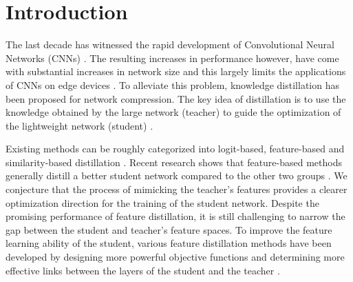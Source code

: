 \documentclass{article}
\begin{document}
\section{Introduction}
The last decade has witnessed the rapid development of Convolutional Neural Networks (CNNs) \cite{alexnet,inception,resnet,convnext,zhi1}. %
The resulting increases in performance however, have come with substantial increases in network size and this largely limits the applications of CNNs on edge devices \cite{mobilenets}. To alleviate this problem, knowledge distillation has been proposed for network compression. The key idea of distillation is to use the knowledge obtained by the large network (teacher) to guide the optimization of the lightweight network (student) \cite{kd,fitnets,sp}.

Existing methods can be roughly categorized into logit-based, feature-based and similarity-based distillation \cite{kdsurvey}. Recent research shows that feature-based methods generally distill a better student network compared to the other two groups \cite{crd,cid}. We conjecture that the process of mimicking the teacher's features provides a clearer optimization direction for the training of the student network. Despite the promising performance of feature distillation, it is still challenging to narrow the gap between the student and teacher's feature spaces. To improve the feature learning ability of the student, various feature distillation methods have been developed by designing more powerful objective functions \cite{crd,pad,srrl,cid} and determining more effective links between the layers of the student and the teacher \cite{kr,afd,semckd}. 
\end{document}
